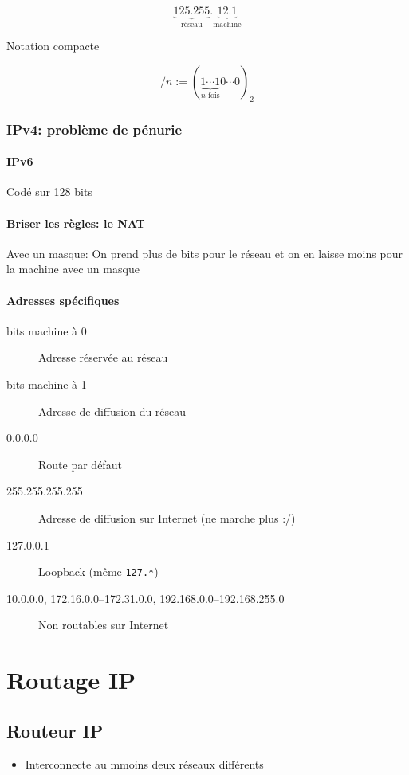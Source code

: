 \documentclass{article}
\begin{document}
\[
	\underbrace{125.255}_{\text{réseau}}.\underbrace{12.1}_{\text{machine}}
\] 

Notation compacte

\[
	/n := (\underbrace{1\cdots 1}_{\text{$n$ fois}} 0 \cdots 0)_2
\] 
\subsubsection{IPv4: problème de pénurie}

\paragraph{IPv6}
 Codé sur 128 bits

 \paragraph{Briser les règles: le NAT}
 Avec un masque: On prend plus de bits pour le réseau et on en laisse moins pour la machine avec un masque 

 \paragraph{Adresses spécifiques}

 \begin{description}
	 \item[bits machine à 0] Adresse réservée au réseau
	\item[bits machine à 1] Adresse de diffusion du réseau
 	\item[0.0.0.0] Route par défaut
	\item[255.255.255.255] Adresse de diffusion sur Internet (ne marche plus :/)
	\item[127.0.0.1] Loopback (même \verb|127.*|)
	\item[10.0.0.0, 172.16.0.0--172.31.0.0, 192.168.0.0--192.168.255.0]  Non routables sur Internet
 \end{description}
 
 
\section{Routage IP}

\subsection{Routeur IP}

\begin{itemize}
    \item Interconnecte au mmoins deux réseaux différents
\end{itemize}
\end{document}
